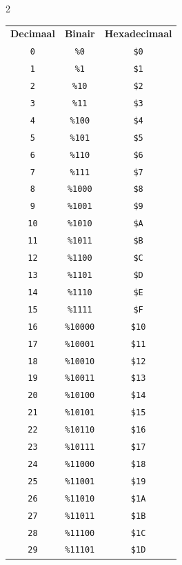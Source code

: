 \begin{multicols}{2}
\begin{center}
	\begin{tabular}{|c|c|c|}
	\hline
		\textbf{Decimaal} & \textbf{Binair} & \textbf{Hexadecimaal} \\ \hhline{|=|=|=|}   	\texttt{0} & \texttt{\%0} &  \texttt{\$0} \\ \hline  \texttt{1} & \texttt{\%1} &  \texttt{\$1} \\ \hline  \texttt{2} & \texttt{\%10} &  \texttt{\$2} \\ \hline  \texttt{3} & \texttt{\%11} &  \texttt{\$3} \\ \hline  \texttt{4} & \texttt{\%100} &  \texttt{\$4} \\ \hline  \texttt{5} & \texttt{\%101} &  \texttt{\$5} \\ \hline  \texttt{6} & \texttt{\%110} &  \texttt{\$6} \\ \hline  \texttt{7} & \texttt{\%111} &  \texttt{\$7} \\ \hline  \texttt{8} & \texttt{\%1000} &  \texttt{\$8} \\ \hline  \texttt{9} & \texttt{\%1001} &  \texttt{\$9} \\ \hline  \texttt{10} & \texttt{\%1010} &  \texttt{\$A} \\ \hline  \texttt{11} & \texttt{\%1011} &  \texttt{\$B} \\ \hline  \texttt{12} & \texttt{\%1100} &  \texttt{\$C} \\ \hline  \texttt{13} & \texttt{\%1101} &  \texttt{\$D} \\ \hline  \texttt{14} & \texttt{\%1110} &  \texttt{\$E} \\ \hline  \texttt{15} & \texttt{\%1111} &  \texttt{\$F} \\ \hline  \texttt{16} & \texttt{\%10000} &  \texttt{\$10} \\ \hline  \texttt{17} & \texttt{\%10001} &  \texttt{\$11} \\ \hline  \texttt{18} & \texttt{\%10010} &  \texttt{\$12} \\ \hline  \texttt{19} & \texttt{\%10011} &  \texttt{\$13} \\ \hline  \texttt{20} & \texttt{\%10100} &  \texttt{\$14} \\ \hline  \texttt{21} & \texttt{\%10101} &  \texttt{\$15} \\ \hline  \texttt{22} & \texttt{\%10110} &  \texttt{\$16} \\ \hline  \texttt{23} & \texttt{\%10111} &  \texttt{\$17} \\ \hline  \texttt{24} & \texttt{\%11000} &  \texttt{\$18} \\ \hline  \texttt{25} & \texttt{\%11001} &  \texttt{\$19} \\ \hline  \texttt{26} & \texttt{\%11010} &  \texttt{\$1A} \\ \hline  \texttt{27} & \texttt{\%11011} &  \texttt{\$1B} \\ \hline  \texttt{28} & \texttt{\%11100} &  \texttt{\$1C} \\ \hline  \texttt{29} & \texttt{\%11101} &  \texttt{\$1D} \\ \hline  
\end{tabular}
\end{center}
\end{multicols}
